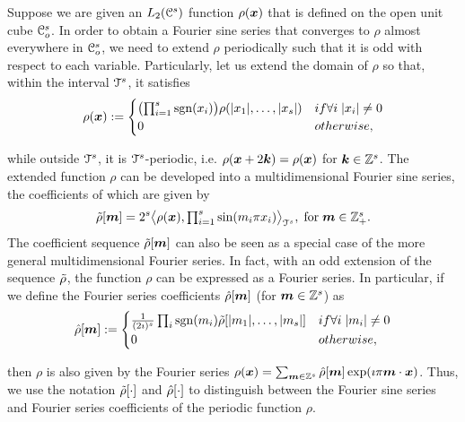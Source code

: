 Suppose we are given an $L_2(\mathcal{C}^s)$ function $\rho(
\boldsymbol{x})$ that is
defined on the open unit cube $\mathcal{C}_o^s$. In order to obtain a
Fourier sine series that converges to $\rho$ almost everywhere in
$\mathcal{C}_o^s$, we need to extend $\rho$ periodically such that it is odd
with respect to each variable. Particularly, let us extend the domain
of $\rho$ so that, within the interval $\mathcal{T}^s$, it satisfies
{\small
\begin{equation}  
 \rho(\vect{x}) :=  
\begin{cases}
\bigl( \prod_{i=1}^s \sgn(x_i) \bigr)
\rho(|x_1|, \ldots, |x_s| ) &\mbox{if } \forall i \; |x_i| \ne 0 \\ 
0 &\mbox{otherwise},
\end{cases}
\label{eq:oddextension}
\end{equation}
}

while outside $\mathcal{T}^s$, it is $\mathcal{T}^s$-periodic, i.e. $\rho(\boldsymbol{x}
+ 2\boldsymbol{k}) = \rho(\boldsymbol{x})$ for $\boldsymbol{k} \in \mathbb{Z}^s$. The
extended function $\rho$ can be developed into a multidimensional
Fourier sine series, the coefficients of which are given by 
\begin{equation}
  \tilde{\rho}[\boldsymbol{m}] = 2^s \bigl \langle \rho(\boldsymbol{x}) , \textstyle{\prod_{i=1}^s}\sin(m_i\pi x_i) \bigr \rangle_{\mathcal{T}^s}, \; \text{for}\; \boldsymbol{m} \in \mathbb{Z}^s_+.
\end{equation}
The coefficient sequence $\tilde{\rho}[\boldsymbol{m}]$ can also be seen as a
special case of the more general multidimensional Fourier
series. In fact, with an odd extension of the sequence $\tilde{\rho}$, the
function $\rho$ can be expressed as a Fourier series. In particular,
if we define the Fourier series coefficients $\hat{\rho}[\boldsymbol{m}]$
(for $\boldsymbol{m} \in \mathbb{Z}^s$) as
{\small \begin{equation}
	\ft{\rho}[\vect{m}] := 
	\begin{cases}
	\frac{1}{(2\imath)^{s}} \prod_i \sgn(m_i)
	\st{\rho}[|m_1|,\ldots,|m_s|] &\mbox{if } \forall i \; |m_i| \ne 0 \\
	0 &\mbox{otherwise},
	\end{cases}
	\label{eq:oddFourierExtension}
\end{equation}}

then  $\rho$ is also given by the Fourier series
$
  \rho(\boldsymbol{x}) = \sum_{\boldsymbol{m} \in
    \mathbb{Z}^s} \hat{\rho}[\boldsymbol{m}] 
\exp(\imath \pi \boldsymbol{m} \cdot \boldsymbol{x})
$.
Thus, we use the notation $\tilde{\rho}[\cdot]$ and $\hat{\rho}[\cdot]$ to
distinguish between the Fourier sine series and Fourier series
coefficients of the periodic function $\rho$.

